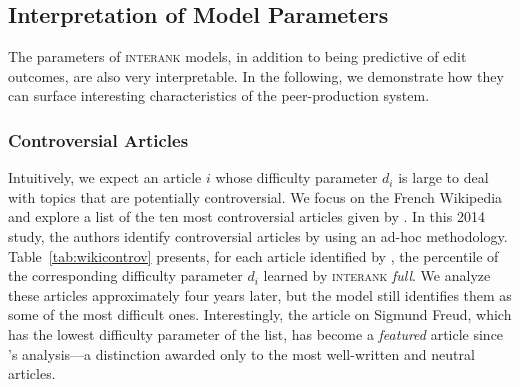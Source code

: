 \subsection{Interpretation of Model Parameters}

The parameters of \textsc{interank} models, in addition to being predictive of edit outcomes, are also very interpretable.
In the following, we demonstrate how they can surface interesting characteristics of the peer-production system.

\subsubsection{Controversial Articles}
Intuitively, we expect an article $i$ whose difficulty parameter $d_i$ is large to deal with topics that are potentially controversial.
We focus on the French Wikipedia and explore a list of the ten most controversial articles given by \citet{yasseri2014most}.
In this 2014 study, the authors identify controversial articles by using an ad-hoc methodology.
Table~\ref{tab:wikicontrov} presents, for each article identified by \citeauthor{yasseri2014most}, the percentile of the corresponding difficulty parameter $d_i$ learned by \textsc{interank} \emph{full}.
We analyze these articles approximately four years later, but the model still identifies them as some of the most difficult ones.
Interestingly, the article on Sigmund Freud, which has the lowest difficulty parameter of the list, has become a \emph{featured} article since \citeauthor{yasseri2014most}'s analysis---a distinction awarded only to the most well-written and neutral articles.

